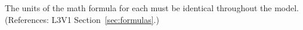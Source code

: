 The units of the math formula for each \KineticLaw must be
identical throughout the model.
(References: L3V1 Section~\ref{sec:formulas}.)
